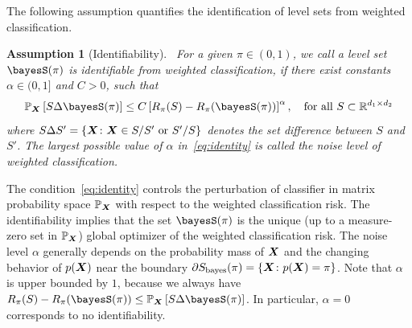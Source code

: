 \documentclass[12pt]{article}
\newtheorem{assumption}{Assumption}
\begin{document}
The following assumption quantifies the identification of level sets from weighted classification.  
\begin{assumption}[Identifiability]~\label{ass:identifiability} For a given $\pi\in(0,1)$, we call a level set $\bayesS(\pi)$ is identifiable from weighted classification, if there exist constants $\alpha\in(0,1]$ and $C>0$, such that
\begin{equation}\label{eq:identity}
\mathbb{P}_{\mX}\left[ S  \Delta \bayesS(\pi)\right]\leq C \left[R_{\pi}(S)-R_{\pi}(\bayesS(\pi))\right]^{\alpha}, \quad \text{for all }S\subset \mathbb{R}^{d_1\times d_2}
\end{equation}
where $S\Delta S'=\{\bm X\colon \bm X\in S/S' \text{ or }S'/S\}$ denotes the set difference between $S$ and $S'$. The largest possible value of $\alpha$ in~\eqref{eq:identity} is called the noise level of weighted classification. 
\end{assumption}

The condition~\eqref{eq:identity} controls the perturbation of classifier in matrix probability space $\mathbb{P}_{\bm X}$ with respect to the weighted classification risk. The identifiability implies that the set $\bayesS(\pi)$ is the unique (up to a measure-zero set in $\mathbb{P}_{\bm X}$) global optimizer of the weighted classification risk. The noise level $\alpha$ generally depends on the probability mass of $\bm X$ and the changing behavior of $p(\bm X)$ near the boundary $\partial S_{\text{bayes}}(\pi)=\{\bm X\colon p(\bm X)=\pi\}$. Note that $\alpha$ is upper bounded by $1$, because we always have $R_{\pi}(S)-R_{\pi}(\bayesS(\pi))\leq \mathbb{P}_{\mX}\left[S \Delta \bayesS(\pi)\right]$. In particular, $\alpha=0$ corresponds to no identifiability. 
\end{document}
